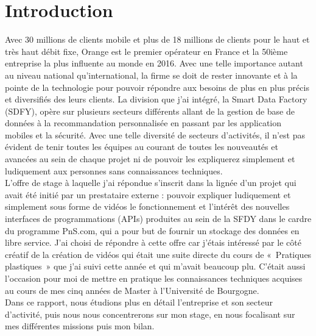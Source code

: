 \chapter*{Introduction}
\label{chap:introduction}

Avec 30 millions de clients mobile et plus de 18 millions de clients  pour le haut et très haut débit fixe, Orange est le premier opérateur en France et la 50ième entreprise la plus influente au monde en 2016. Avec une telle importance autant au niveau national qu'international, la firme se doit de rester innovante et à la pointe de la technologie pour pouvoir répondre aux besoins de plus en plus précis et diversifiés des leurs clients. La division que j’ai intégré, la Smart Data Factory (SDFY), opère sur plusieurs secteurs différents allant de la gestion de base de données à la recommandation personnalisée en passant par les application mobiles et la sécurité. Avec une telle diversité de secteurs d’activités, il n’est pas évident de tenir toutes les équipes au courant de toutes les nouveautés et avancées au sein de chaque projet ni de pouvoir les expliquerez simplement et ludiquement aux personnes sans connaissances techniques.\\
L’offre de stage à laquelle j’ai répondue s’inscrit dans la lignée d’un projet qui avait été initié par un prestataire externe : pouvoir expliquer ludiquement et simplement sous forme de vidéos le fonctionnement et l’intérêt des nouvelles  interfaces de programmations (APIs) produites au sein de la SFDY dans le cardre du programme PnS.com, qui a pour but de fournir un stockage des données en libre service. J’ai choisi de répondre à cette offre car j’étais intéressé par le côté créatif de la création de vidéos qui était une suite directe du cours de « Pratiques plastiques » que j’ai suivi cette année et qui m’avait beaucoup plu. C’était aussi l’occasion pour moi de mettre en pratique les connaissances techniques acquises au cours de mes cinq années de Master à l’Université de Bourgogne.\\
Dans ce rapport, nous étudions plus en détail l’entreprise et son secteur d’activité, puis nous nous concentrerons sur mon stage, en nous focalisant sur mes différentes missions puis mon bilan.
